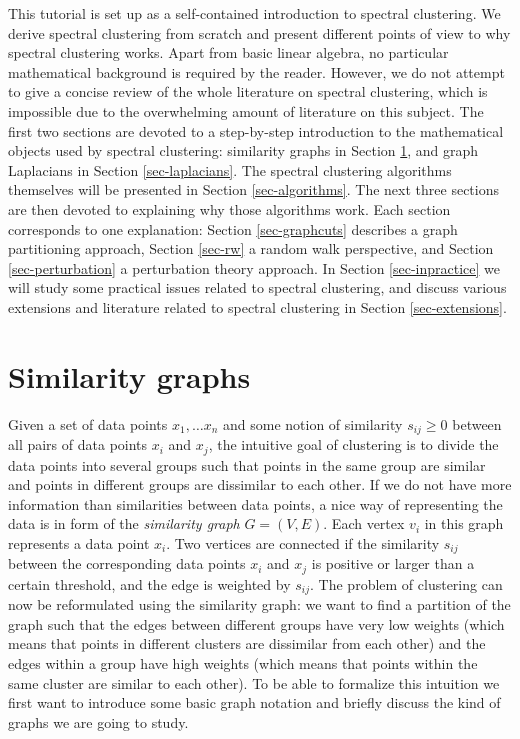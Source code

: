 \documentclass{article}
\begin{document}
This tutorial is set up as a self-contained introduction to spectral
clustering. We derive spectral clustering from scratch and present
different points of view to why spectral clustering works.
Apart from basic linear algebra, no particular mathematical background
is required by the reader. However, we do not attempt to give a
concise review of the whole literature on spectral clustering, which
is impossible due to the overwhelming amount of
literature on this subject.  The first two sections are devoted to a
step-by-step introduction to the mathematical objects used by spectral
clustering: similarity graphs in Section \ref{sec-graphs}, and graph
Laplacians in Section \ref{sec-laplacians}. The spectral clustering
algorithms themselves will be presented in Section
\ref{sec-algorithms}.  The next three sections are then devoted to
explaining why those algorithms work. Each section corresponds to one
explanation: Section \ref{sec-graphcuts} describes a graph
partitioning approach, Section \ref{sec-rw} a random walk perspective,
and Section \ref{sec-perturbation} a perturbation theory approach. In
Section \ref{sec-inpractice} we will study some practical issues
related to spectral clustering, and discuss various extensions and
literature related to spectral clustering in Section
\ref{sec-extensions}.






%
\section{Similarity graphs} \label{sec-graphs}
%

Given a set of data points $x_1,\hdots x_n$ and some notion of
similarity $s_{ij} \geq 0$ between all pairs of data points $x_i$ and
$x_j$, the intuitive goal of clustering is to divide the data points
into several groups such that points in the same group are similar and
points in different groups are dissimilar to each other. If we do not
have more information than similarities between data points, a nice
way of representing the data is in form of the {\em similarity graph}
$G = (V,E)$. Each vertex $v_i$ in this graph represents a data point
$x_i$.  Two vertices are connected if the similarity $s_{ij}$ between
the corresponding data points $x_i$ and $x_j$ is positive or larger
than a certain threshold, and the edge is weighted by $s_{ij}$.  The
problem of clustering can now be reformulated using the similarity
graph: we want to find a partition of the graph such that the edges
between different groups have very low weights (which means that
points in different clusters are dissimilar from each other) and the
edges within a group have high weights (which means that points within
the same cluster are similar to each other). To be able to formalize
this intuition we first want to introduce some basic graph notation
and briefly discuss the kind of graphs we are going to study.
\end{document}
